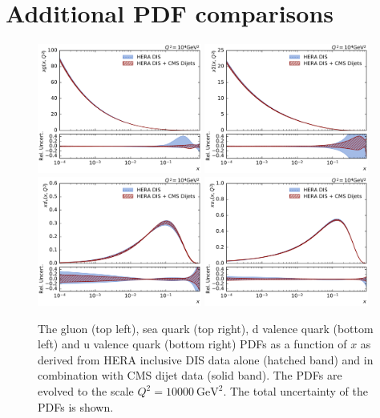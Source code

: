 \section{Additional PDF comparisons}
%
\begin{figure}[htb]
  \centering
  \includegraphics[width=0.48\textwidth]{figures/pdf_constraints/pdfcomp_direct_0_10000.pdf}\hfill%
  \includegraphics[width=0.48\textwidth]{figures/pdf_constraints/pdfcomp_direct_9_10000.pdf}
  \includegraphics[width=0.48\textwidth]{figures/pdf_constraints/pdfcomp_direct_7_10000.pdf}\hfill%
  \includegraphics[width=0.48\textwidth]{figures/pdf_constraints/pdfcomp_direct_8_10000.pdf}
  \caption[Direct comparison of gluon and quark PDFs]{The gluon (top left), sea
  quark (top right), d valence quark (bottom left) and u valence quark (bottom
right) PDFs as a function of $x$ as derived from HERA inclusive DIS data
alone (hatched band) and in combination with CMS dijet data (solid band). The PDFs
are evolved to the scale $Q^2 = \SI{10000}{\GeV \squared}$. The total
uncertainty of the PDFs is shown.}
\label{fig:pdfconstraints:direct:10000}
\end{figure}

